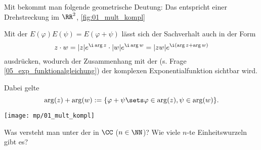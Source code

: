 \begin{antwort}[]%
  \Ant Mit {\astref} bekommt man folgende geometrische Deutung:  
  Das entspricht einer Drehstreckung im $\RR^2$, 
  \sieheAbbildung\ref{fig:01_mult_kompl}

  Mit der  $E(\varphi) E(\psi) = E(\varphi+\psi)$
  lässt sich der Sachverhalt auch in der Form 
  \[
  z\cdot w = |z| e^{\i\arg z} \cdot |w| e^{\i\arg w} = 
  |zw| e^{\i( \arg z+\arg w)}
  \]
  ausdrücken, wodurch der Zusammenhang mit der 
   (s. Frage \ref{05_exp_funktionalgleichung}) 
  der komplexen Exponentialfunktion sichtbar wird.  

  Dabei gelte 
  \[
  \arg(z)+\arg(w) := \{ \varphi + \psi \sets \varphi\in\arg(z), \psi \in\arg(w) \}.
  \]
  \AntEnd 

  \begin{center}
    \texttt{[image: mp/01\_mult\_kompl]}
    \label{fig:01_mult_kompl}
  \end{center}
\end{antwort}







\begin{frage}
  Was versteht man unter der 
   in $\CC$ ($n\in\NN$)? 
  Wie viele $n$-te Einheitswurzeln gibt es?
\end{frage}

